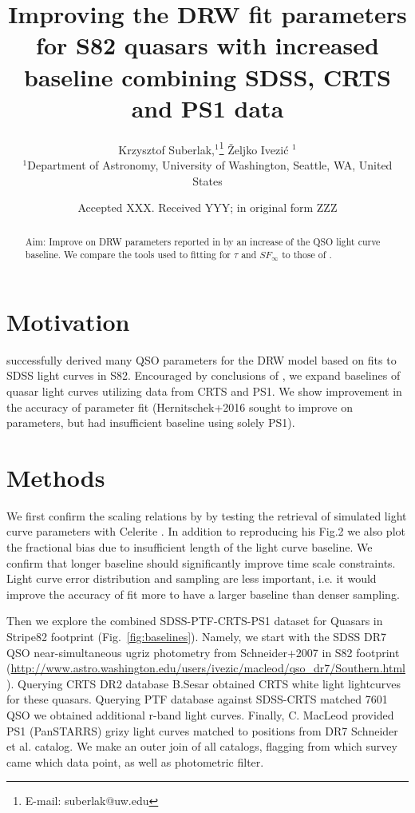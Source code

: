 \documentclass[fleqn,usenatbib]{mnras}  %
\title[DRW baseline]{ Improving the DRW fit parameters for S82 quasars with increased baseline combining SDSS, CRTS and PS1 data}
\author[K. Suberlak et al.]{
Krzysztof Suberlak,$^{1}$\thanks{E-mail: suberlak@uw.edu}
\v{Z}eljko Ivezi\'c $^{1}$
\\
$^{1}$Department of Astronomy, University of Washington, Seattle, WA, United States\\
}
\date{Accepted XXX. Received YYY; in original form ZZZ}
\begin{document}
\label{firstpage}
\pagerange{\pageref{firstpage}--\pageref{lastpage}}
\maketitle

\begin{abstract}
 Aim: Improve on DRW parameters reported in \cite{macleod2011} by an increase of the QSO light curve baseline.  We compare the tools used to fitting for $\tau$ and $SF_{\infty}$ to those of \cite{kozlowski2017a}.
\end{abstract}




\section{Motivation}
\cite{macleod2011} successfully  derived  many QSO parameters for the DRW model based on fits to SDSS light curves in S82. Encouraged by conclusions of \cite{kozlowski2017a},  we expand baselines of quasar light curves  utilizing data from CRTS and PS1. We show improvement in the accuracy of parameter fit (Hernitschek+2016 sought to improve on parameters, but had insufficient baseline using solely PS1). 

\section{Methods}
 We first confirm the scaling relations by \cite{kozlowski2017a }by testing the retrieval of simulated light curve parameters with Celerite . In addition to reproducing his Fig.2  we also plot the fractional bias due to insufficient length of the  light curve baseline. We confirm that longer  baseline should significantly improve time scale constraints. Light curve error distribution and sampling are less important, i.e. it would improve the accuracy of fit more to have a larger baseline than denser sampling. 

Then we explore the combined SDSS-PTF-CRTS-PS1  dataset for Quasars in Stripe82 footprint (Fig.~\ref{fig:baselines}). Namely, we start with the SDSS DR7 QSO near-simultaneous ugriz photometry from Schneider+2007 in S82 footprint (\url{http://www.astro.washington.edu/users/ivezic/macleod/qso_dr7/Southern.html} ).  Querying CRTS DR2 database B.Sesar obtained CRTS white light lightcurves for these quasars.   Querying PTF database against SDSS-CRTS matched 7601 QSO we obtained additional r-band light curves.  Finally, C. MacLeod provided PS1 (PanSTARRS)  grizy  light curves matched to positions from DR7 Schneider et al. catalog. We make an outer join of all catalogs,  flagging from which survey came which data point, as well as photometric filter. 
\end{document}
